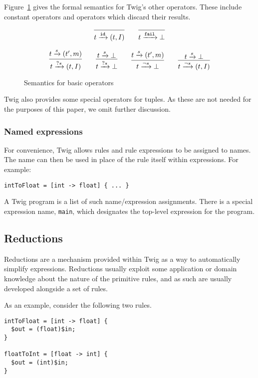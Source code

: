 Figure~\ref{semantics:basic} gives the formal semantics for Twig's other operators. These include constant operators and operators which discard their results.

\begin{figure}[ht]
\[
\infer{t \arr{\mathtt{id}} (t,I)}{}
\qquad
\infer{t \arr{\mathtt{fail}} \bot}{}
\]

\[
\infer{t \arr{?s} (t,I)}{t \arr{s} (t',m)}
\qquad 
\infer{t \arr{?s} \bot}{t \arr{s} \bot}
\qquad
\infer{t \arr{\lnot s} \bot}{t \arr{s} (t',m)}
\qquad 
\infer{t \arr{\lnot s} (t,I)}{t \arr{s} \bot}
\]
\caption{Semantics for basic operators}
\label{semantics:basic}
\end{figure}

Twig also provides some special operators for tuples. As these are not needed for the purposes of this paper, we omit further discussion.

\subsubsection{Named expressions}
\label{section:names}

For convenience, Twig allows rules and rule expressions to be assigned to names. The name can then be used in place of the rule itself within expressions. For example:

\begin{verbatim}
intToFloat = [int -> float] { ... }
\end{verbatim}

A Twig program is a list of such name/expression assignments. There is a special expression name, \texttt{main}, which designates the top-level expression for the program.

\subsection{Reductions}
\label{sec:reductions}

Reductions are a mechanism provided within Twig as a way to automatically simplify expressions. Reductions usually exploit some application or domain knowledge about the nature of the primitive rules, and as such are usually developed alongside a set of rules.

As an example, consider the following two rules.

\begin{verbatim}
intToFloat = [int -> float] {
  $out = (float)$in;
}

floatToInt = [float -> int] {
  $out = (int)$in;
}
\end{verbatim}

